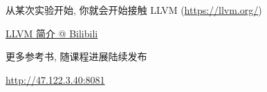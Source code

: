 \begin{frame}{}

  \begin{center}
    从某次实验开始, 你就会开始接触 LLVM (\url{https://llvm.org/})
  \end{center}
\end{frame}

\begin{frame}{}

  \vspace{0.20cm}
  \begin{center}
    \href{https://www.bilibili.com/video/BV1RF411K7F5/?vd_source=e3cbbf5ca80db268fa006d63626e267e}{LLVM 简介 @ Bilibili}
  \end{center}
\end{frame}

\begin{frame}{}
  \begin{center}

    \vspace{0.50cm}
    更多参考书, 随课程进展陆续发布

    \vspace{0.30cm}
    \url{http://47.122.3.40:8081}
  \end{center}
\end{frame}
